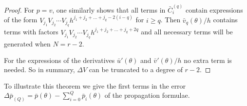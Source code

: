 \begin{proof}
    For $p=v$, one similarly shows that all terms in $\bar{C}_i^{(q)}$ contain expressions of the form $ V_{j_1} V_{j_2} \cdots V_{j_q} h^{j_1+j_2+\ldots+j_q - 2 (i-q)}$ for $i \geq q$. Then $\bar{v}_q(\theta)/h$ contains terms with factors $ V_{j_1} V_{j_2} \cdots V_{j_q} h^{j_1+j_2+\ldots+j_q+ 2 q}$ and all necessary terms will be generated when $N = r-2$.

    For the expressions of the derivatives $\bar{u}'(\theta)$ and $\bar{v}'(\theta)/h$ no extra term is needed. So in summary, $\Delta V$ can be truncated to a degree of $r - 2$.

\end{proof}

To illustrate this theorem we give the first terms in the error $\Delta \bar{p}_{(Q)} = \bar{p}(\theta) - \displaystyle\sum_{i=0}^{Q} \bar{p}_{i}(\theta)$  of the propagation formulae.

